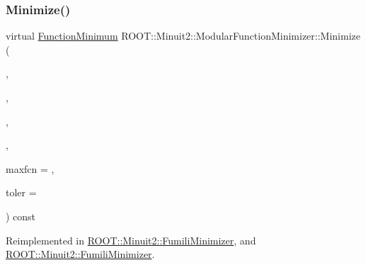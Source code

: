 \subsubsection{\texorpdfstring{Minimize()}{Minimize()}\hspace{0.1cm}{\footnotesize\ttfamily [13/22]}}
{\footnotesize\ttfamily virtual \mbox{\hyperlink{classROOT_1_1Minuit2_1_1FunctionMinimum}{Function\+Minimum}} R\+O\+O\+T\+::\+Minuit2\+::\+Modular\+Function\+Minimizer\+::\+Minimize (\begin{DoxyParamCaption}\item[{const \mbox{\hyperlink{classROOT_1_1Minuit2_1_1FCNBase}{F\+C\+N\+Base}} \&}]{,  }\item[{const \mbox{\hyperlink{classROOT_1_1Minuit2_1_1MnUserParameters}{Mn\+User\+Parameters}} \&}]{,  }\item[{const \mbox{\hyperlink{classROOT_1_1Minuit2_1_1MnUserCovariance}{Mn\+User\+Covariance}} \&}]{,  }\item[{const \mbox{\hyperlink{classROOT_1_1Minuit2_1_1MnStrategy}{Mn\+Strategy}} \&}]{,  }\item[{unsigned int}]{maxfcn = {},  }\item[{double}]{toler = {} }\end{DoxyParamCaption}) const\hspace{0.3cm}{\ttfamily [virtual]}}



Reimplemented in \mbox{\hyperlink{classROOT_1_1Minuit2_1_1FumiliMinimizer_a954728eb57315bb43039fe2ba71f4098}{R\+O\+O\+T\+::\+Minuit2\+::\+Fumili\+Minimizer}}, and \mbox{\hyperlink{classROOT_1_1Minuit2_1_1FumiliMinimizer_a954728eb57315bb43039fe2ba71f4098}{R\+O\+O\+T\+::\+Minuit2\+::\+Fumili\+Minimizer}}.

\mbox{\label{classROOT_1_1Minuit2_1_1ModularFunctionMinimizer_a8db208c6cdcef4c527781732ee613436}} 
